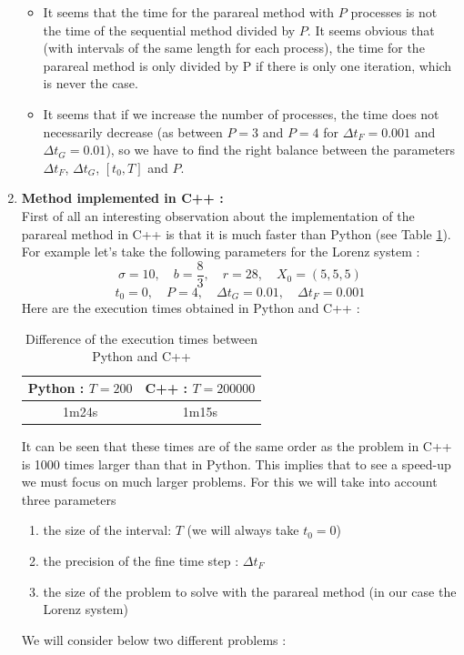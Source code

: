 \begin{enumerate}[label=\textbullet]
\begin{itemize}[label=-]
		\item It seems that the time for the parareal method with $P$ processes is not the time of the sequential method divided by $P$. It seems obvious that (with intervals of the same length for each process), the time for the parareal method is only divided by P if there is only one iteration, which is never the case.
		\item It seems that if we increase the number of processes, the time does not necessarily decrease (as between $P=3$ and $P=4$ for $\Delta t_F=0.001$ and $\Delta t_G=0.01$), so we have to find the right balance between the parameters $\Delta t_F$, $\Delta t_G$, $[t_0,T]$ and $P$.
	\end{itemize}
	\item \textbf{Method implemented in C++ :} \\
	First of all an interesting observation about the implementation of the parareal method in C++ is that it is much faster than Python (see Table \ref{cpp_faster}). \\
	For example let's take the following parameters for the Lorenz system :
	$$\sigma=10, \quad b=\frac{8}{3}, \quad r=28, \quad X_0=(5,5,5)$$
	$$t_0=0, \quad P=4,\quad \Delta t_G=0.01, \quad \Delta t_F=0.001$$
	Here are the execution times obtained in Python and C++ :
	\begin{table}[H]
		\centering
		\begin{tabular}{| c | c |}
			\hline
			Python : $T=200$ & C++ : $T=200000$ \\
			\hline 
			1m24s & 1m15s \\
			\hline
		\end{tabular}
		\caption{Difference of the execution times between Python and C++}
		\label{cpp_faster}
	\end{table}
	It can be seen that these times are of the same order as the problem in C++ is 1000 times larger than that in Python. This implies that to see a speed-up we must focus on much larger problems. For this we will take into account three parameters
	\begin{enumerate}[label=\textbullet]
		\item the size of the interval: $T$ (we will always take $t_0=0$)
		\item the precision of the fine time step : $\Delta t_F$
		\item the size of the problem to solve with the parareal method (in our case the Lorenz system)
	\end{enumerate}
	We will consider below two different problems :

\end{enumerate}
